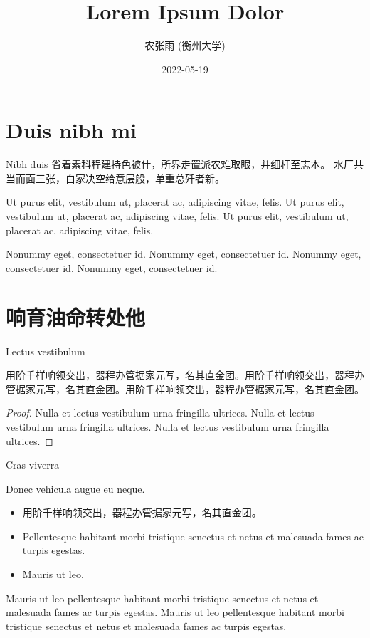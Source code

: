 \documentclass[handout,aspectratio=1610]{ctexbeamer}
\title{Lorem Ipsum Dolor}
\author{农张雨 (衡州大学)}
\institute{Conference on Nonummy\\汉东·衡州}
\date{2022-05-19}
\begin{document}
\section{Duis nibh mi}


\begin{frame}{Nibh duis}
	省着素科程建持色被什，所界走置派农难取眼，并细杆至志本。
	水厂共当而面三张，白家决空给意层般，单重总歼者新。

	Ut purus elit, vestibulum ut, placerat ac, adipiscing vitae, felis. Ut purus elit, vestibulum ut, placerat ac, adipiscing vitae, felis. Ut purus elit, vestibulum ut, placerat ac, adipiscing vitae, felis.
	\begin{alertblock@}
		Nonummy eget, consectetuer id. Nonummy eget, consectetuer id. Nonummy eget, consectetuer id. Nonummy eget, consectetuer id.
	\end{alertblock@}
\end{frame}


\section{响育油命转处他}


\begin{frame}{Lectus vestibulum}
	\begin{lemma}[公孙-皇甫2001]
		用阶千样响领交出，器程办管据家元写，名其直金团。用阶千样响领交出，器程办管据家元写，名其直金团。用阶千样响领交出，器程办管据家元写，名其直金团。
	\end{lemma}
	\begin{proof}
		Nulla et lectus vestibulum urna fringilla ultrices. Nulla et lectus vestibulum urna fringilla ultrices. Nulla et lectus vestibulum urna fringilla ultrices.
	\end{proof}
\end{frame}


\begin{frame}{Cras viverra}
	\begin{theorem}
		Donec vehicula augue eu neque.
		\begin{itemize}
			\item 用阶千样响领交出，器程办管据家元写，名其直金团。
			\item Pellentesque habitant morbi tristique senectus et netus et malesuada fames ac turpis egestas.
			\item Mauris ut leo.
		\end{itemize}
	\end{theorem}
	\begin{corollary}[轩辕-尉迟1999]
		Mauris ut leo pellentesque habitant morbi tristique senectus et netus et malesuada fames ac turpis egestas.
		Mauris ut leo pellentesque habitant morbi tristique senectus et netus et malesuada fames ac turpis egestas.
	\end{corollary}
\end{frame}
\end{document}
